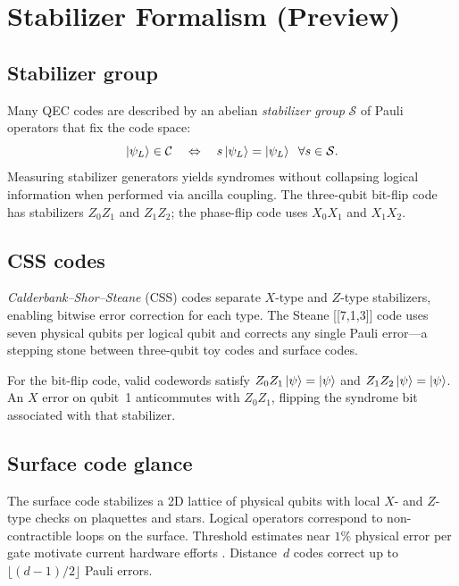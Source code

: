\section{Stabilizer Formalism (Preview)}
\label{sec:stabilizers}

\subsection{Stabilizer group}

Many QEC codes are described by an abelian \emph{stabilizer group} $\mathcal{S}$ of Pauli operators that fix the code space:
\begin{equation}
\ket{\psi_L}\in\mathcal{C}\quad\Leftrightarrow\quad s\ket{\psi_L}=\ket{\psi_L}\;\;\forall s\in\mathcal{S}.
\label{eq:stabilizer}
\end{equation}
Measuring stabilizer generators yields syndromes without collapsing logical information when performed via ancilla coupling. The three-qubit bit-flip code has stabilizers $Z_0Z_1$ and $Z_1Z_2$; the phase-flip code uses $X_0X_1$ and $X_1X_2$.

\subsection{CSS codes}

\emph{Calderbank--Shor--Steane} (CSS) codes separate $X$-type and $Z$-type stabilizers, enabling bitwise error correction for each type. The Steane [[7,1,3]] code uses seven physical qubits per logical qubit and corrects any single Pauli error---a stepping stone between three-qubit toy codes and surface codes.

\begin{example}
For the bit-flip code, valid codewords satisfy $Z_0Z_1\ket{\psi}=\ket{\psi}$ and $Z_1Z_2\ket{\psi}=\ket{\psi}$. An $X$ error on qubit~1 anticommutes with $Z_0Z_1$, flipping the syndrome bit associated with that stabilizer.
\end{example}

\subsection{Surface code glance}

The surface code stabilizes a 2D lattice of physical qubits with local $X$- and $Z$-type checks on plaquettes and stars. Logical operators correspond to non-contractible loops on the surface. Threshold estimates near $1\%$ physical error per gate motivate current hardware efforts \cite{acharya2024}. Distance~$d$ codes correct up to $\lfloor(d-1)/2\rfloor$ Pauli errors.

